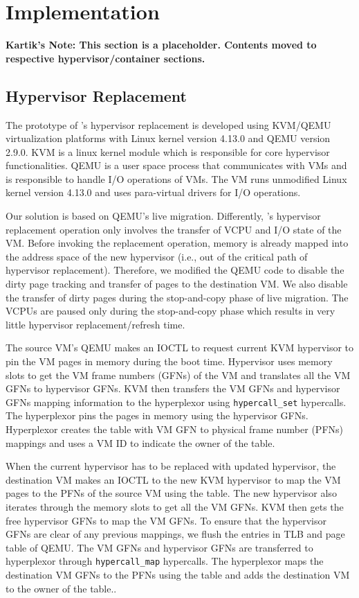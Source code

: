 \section{Implementation}

{\bf Kartik's Note: This section is a placeholder. Contents moved to respective hypervisor/container sections.}

\subsection{Hypervisor Replacement} 
The prototype of \arch's hypervisor replacement is developed using KVM/QEMU virtualization platforms with Linux kernel version 4.13.0 and QEMU version 2.9.0. KVM is a linux kernel module which is responsible for core hypervisor functionalities. QEMU is a user space process that communicates with VMs and is responsible to handle I/O operations of VMs. The VM runs unmodified Linux kernel version 4.13.0 and uses para-virtual drivers for I/O operations.

Our solution is based on QEMU's live migration. Differently, \arch's hypervisor replacement operation only involves the transfer of VCPU and I/O state of the VM. Before invoking the replacement operation, memory is already mapped into the address space of the new hypervisor (i.e., out of the critical path of hypervisor replacement). Therefore, we modified the QEMU code to disable the dirty page tracking and transfer of pages to the destination VM. We also disable the transfer of dirty pages during the stop-and-copy phase of live migration. The VCPUs are paused only during the stop-and-copy phase which results in very little hypervisor replacement/refresh time.

The source VM's QEMU makes an IOCTL to request current KVM hypervisor to pin the VM pages in memory during the boot time. Hypervisor uses memory slots to get the VM frame numbers (GFNs) of the VM and translates all the VM GFNs to hypervisor GFNs. KVM then transfers the VM GFNs and hypervisor GFNs mapping information to the hyperplexor using \texttt{hypercall\_set} hypercalls. The hyperplexor pins the pages in memory using the hypervisor GFNs. Hyperplexor creates the \arch table with VM GFN to physical frame number (PFNs) mappings and uses a VM ID to indicate the owner of the \arch table. 

When the current hypervisor has to be replaced with updated hypervisor, the destination VM makes an IOCTL to the new KVM hypervisor to map the VM pages to the PFNs of the source VM using the \arch table. The new hypervisor also iterates through the memory slots to get all the VM GFNs. KVM then gets the free hypervisor GFNs to map the VM GFNs. To ensure that the hypervisor GFNs are clear of any previous mappings, we flush the entries in TLB and page table of QEMU. The VM GFNs and hypervisor GFNs are transferred to hyperplexor through \texttt{hypercall\_map} hypercalls. The hyperplexor maps the destination VM GFNs to the PFNs using the \arch table and adds the destination VM to the owner of the \arch table..

